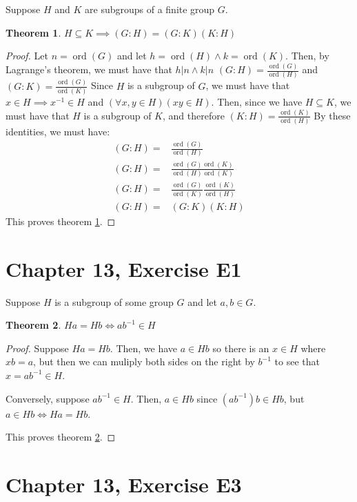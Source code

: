 \documentclass[12pt]{article}
\newcommand{\ord}{\operatorname{ord}}
\newtheorem{thm}{Theorem}
\begin{document}
Suppose $H$ and $K$ are subgroups of a finite group $G$.

\begin{thm} \label{thm4}
	$H \subseteq K \implies (G:H) = (G:K)(K:H)$
\end{thm}

\begin{proof}
	Let $n = \ord(G)$
	and let $h = \ord(H) \land k = \ord(K)$.
	Then, by Lagrange's theorem,
	we must have that $h | n \land k | n$
	$(G:H) = \frac{\ord(G)}{\ord(H)}$ and
	$(G:K) = \frac{\ord(G)}{\ord(K)}$
	Since $H$ is a subgroup of $G$,
	we must have that
	$x \in H \implies x^{-1} \in H$
	and $(\forall x,y \in H)(xy \in H)$.
	Then, since we have $H \subseteq K$,
	we must have that $H$ is a subgroup of $K$,
	and therefore $(K:H) = \frac{\ord(K)}{\ord(H)}$
	By these identities, we must have:
	\begin{align}
		(G:H) = & \frac{\ord(G)}{\ord(H)} \\
		(G:H) = & \frac{\ord(G)\ord(K)}{\ord(H)\ord(K)} \\
		(G:H) = & \frac{\ord(G)}{\ord(K)} \frac{\ord(K)}{\ord(H)} \\
		(G:H) = & (G:K)(K:H)
	\end{align}
	This proves theorem \ref{thm4}.
\end{proof}

\section{Chapter 13, Exercise E1}

Suppose $H$ is a subgroup of some group $G$
and let $a,b \in G$.

\begin{thm} \label{thm5}
	$Ha = Hb \iff ab^{-1} \in H$
\end{thm}

\begin{proof}
	Suppose $Ha = Hb$.
	Then, we have $a \in Hb$
	so there is an $x \in H$ where $xb = a$,
	but then we can muliply both sides on the right by $b^{-1}$
	to see that $x = ab^{-1} \in H$.

	Conversely, suppose $ab^{-1} \in H$.
	Then, $a \in Hb$ since $(ab^{-1})b \in Hb$,
	but $a \in Hb \iff Ha = Hb$.
	
	This proves theorem \ref{thm5}.
\end{proof}

\section{Chapter 13, Exercise E3}
\end{document}
